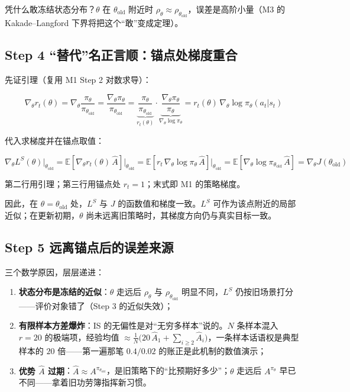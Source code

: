 \documentclass[UTF8,12pt,a4paper]{ctexrep}
\begin{document}
凭什么敢冻结状态分布？$\theta$ 在 $\theta_{\mathrm{old}}$ 附近时 $\rho_\theta \approx \rho_{\theta_{\mathrm{old}}}$，误差是高阶小量（M3 的 Kakade--Langford 下界将把这个``敢''变成定理）。

\subsection*{Step 4 \; ``替代''名正言顺：锚点处梯度重合}

先证引理（复用 M1 Step 2 对数求导）：

$$
\nabla_\theta r_t(\theta) = \nabla_\theta \frac{\pi_\theta}{\pi_{\theta_{\mathrm{old}}}} = \frac{\nabla_\theta \pi_\theta}{\pi_{\theta_{\mathrm{old}}}} = \underbrace{\frac{\pi_\theta}{\pi_{\theta_{\mathrm{old}}}}}_{r_t(\theta)}\cdot \underbrace{\frac{\nabla_\theta \pi_\theta}{\pi_\theta}}_{\nabla_\theta \log \pi_\theta} = r_t(\theta)\,\nabla_\theta \log \pi_\theta(a_t|s_t)
$$

代入求梯度并在锚点取值：

$$
\nabla_\theta L^{S}(\theta)\Big|_{\theta_{\mathrm{old}}} = \mathbb{E}\left[\nabla_\theta r_t(\theta)\, \hat{A}\right]\Big|_{\theta_{\mathrm{old}}} = \mathbb{E}\left[r_t\,\nabla_\theta \log \pi_\theta\, \hat{A}\right]\Big|_{\theta_{\mathrm{old}}} = \mathbb{E}\left[\nabla_\theta \log \pi_{\theta_{\mathrm{old}}}\, \hat{A}\right] = \nabla_\theta J(\theta_{\mathrm{old}})
$$

第二行用引理；第三行用锚点处 $r_t = 1$；末式即 M1 的策略梯度。

因此，在 $\theta=\theta_{\mathrm{old}}$ 处，$L^{S}$ 与 $J$ 的函数值和梯度一致。$L^{S}$ 可作为该点附近的局部近似；在更新初期，$\theta$ 尚未远离旧策略时，其梯度方向仍与真实目标一致。

\subsection*{Step 5 \; 远离锚点后的误差来源}

三个数学原因，层层递进：

\begin{enumerate}[nosep]
  \item \textbf{状态分布是冻结的近似}：$\theta$ 走远后 $\rho_\theta$ 与 $\rho_{\theta_{\mathrm{old}}}$ 明显不同，$L^{S}$ 仍按旧场景打分——评价对象错了（Step 3 的近似失效）；
  \item \textbf{有限样本方差爆炸}：IS 的无偏性是对``无穷多样本''说的。$N$ 条样本混入 $r = 20$ 的极端项，经验均值 $\approx \frac{1}{N}\big(20\,\hat{A}_1 + \sum_{i \ge 2}\hat{A}_i\big)$，一条样本话语权是典型样本的 $20$ 倍——第一遍那笔 $0.4/0.02$ 的账正是此机制的数值演示；
  \item \textbf{优势 $\hat{A}$ 过期}：$\hat{A} \approx A^{\pi_{\theta_{\mathrm{old}}}}$，是旧策略下的``比预期好多少''；$\theta$ 走远后 $A^{\pi_\theta}$ 早已不同——拿着旧功劳簿指挥新习惯。
\end{enumerate}
\end{document}
